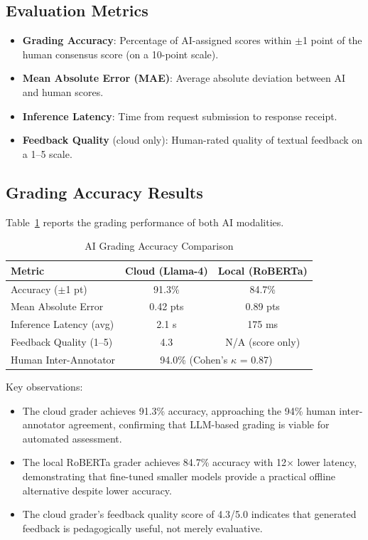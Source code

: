 \documentclass[conference]{IEEEtran}
\begin{document}
\subsection{Evaluation Metrics}
\begin{itemize}[leftmargin=*]
    \item \textbf{Grading Accuracy}: Percentage of AI-assigned scores within $\pm$1 point of the human consensus score (on a 10-point scale).
    \item \textbf{Mean Absolute Error (MAE)}: Average absolute deviation between AI and human scores.
    \item \textbf{Inference Latency}: Time from request submission to response receipt.
    \item \textbf{Feedback Quality} (cloud only): Human-rated quality of textual feedback on a 1--5 scale.
\end{itemize}

\subsection{Grading Accuracy Results}
Table~\ref{tab:grading_results} reports the grading performance of both AI modalities.

\begin{table}[h]
\caption{AI Grading Accuracy Comparison}
\label{tab:grading_results}
\begin{center}
\begin{tabular}{lcc}
\toprule
\textbf{Metric} & \textbf{Cloud (Llama-4)} & \textbf{Local (RoBERTa)} \\
\midrule
Accuracy ($\pm$1 pt) & 91.3\% & 84.7\% \\
Mean Absolute Error & 0.42 pts & 0.89 pts \\
Inference Latency (avg) & 2.1 s & 175 ms \\
Feedback Quality (1--5) & 4.3 & N/A (score only) \\
\midrule
Human Inter-Annotator & \multicolumn{2}{c}{94.0\% (Cohen's $\kappa$ = 0.87)} \\
\bottomrule
\end{tabular}
\end{center}
\end{table}

Key observations:
\begin{itemize}[leftmargin=*]
    \item The cloud grader achieves 91.3\% accuracy, approaching the 94\% human inter-annotator agreement, confirming that LLM-based grading is viable for automated assessment.
    \item The local RoBERTa grader achieves 84.7\% accuracy with 12$\times$ lower latency, demonstrating that fine-tuned smaller models provide a practical offline alternative despite lower accuracy.
    \item The cloud grader's feedback quality score of 4.3/5.0 indicates that generated feedback is pedagogically useful, not merely evaluative.
\end{itemize}
\end{document}
